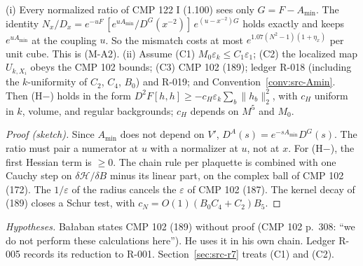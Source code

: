 \begin{proposition}[(M-A2) and (H$-$)]\label{src:MA2}
(i) Every normalized ratio of CMP 122 I (1.100) sees only $G=F-A_{\min}$. The identity $N_x/D_x=e^{-uF}\,[e^{uA_{\min}}/D^G(x^{-2})]\,e^{(u-x^{-2})G}$ holds exactly and keeps $e^{uA_{\min}}$ at the coupling $u$. So the mismatch costs at most $e^{1.07(N^2-1)(1+\eta_x)}$ per unit cube. This is (M-A2).
(ii) Assume (C1) $M_0\varepsilon_k\le C_1\varepsilon_1$; (C2) the localized map $U_{k,X_i}$ obeys the CMP 102 bounds; (C3) CMP 102 (189); ledger R-018 (including the $k$-uniformity of $C_2$, $C_4$, $B_0$) and R-019; and Convention~\ref{conv:src-Amin}. Then (H$-$) holds in the form $D^2F[h,h]\ge-c_H\varepsilon_k\sum_b\|h_b\|_2^2$, with $c_H$ uniform in $k$, volume, and regular backgrounds; $c_H$ depends on $M^5$ and $M_0$.
\end{proposition}
\begin{proof}[Proof (sketch)]
Since $A_{\min}$ does not depend on $V'$, $D^A(s)=e^{-sA_{\min}}D^G(s)$. The ratio must pair a numerator at $u$ with a normalizer at $u$, not at $x$. For (H$-$), the first Hessian term is $\ge0$. The chain rule per plaquette is combined with one Cauchy step on $\delta\mathcal H/\delta B$ minus its linear part, on the complex ball of CMP 102 (172). The $1/\varepsilon$ of the radius cancels the $\varepsilon$ of CMP 102 (187). The kernel decay of (189) closes a Schur test, with $c_N=O(1)(B_0C_4+C_2)B_5$.
\end{proof}
\emph{Hypotheses.} Ba{\l}aban states CMP 102 (189) without proof (CMP 102 p.~308: ``we do not perform these calculations here''). He uses it in his own chain. Ledger R-005 records its reduction to R-001. Section~\ref{sec:src-r7} treats (C1) and (C2).

